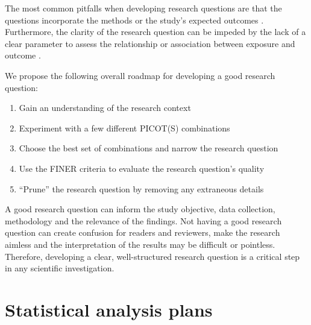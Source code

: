 \documentclass[
]{book}
\providecommand{\tightlist}{%
  \setlength{\itemsep}{0pt}\setlength{\parskip}{0pt}}
\begin{document}
The most common pitfalls when developing research questions are that the questions incorporate the methods or the study's expected outcomes \citep{mayo2013research}. Furthermore, the clarity of the research question can be impeded by the lack of a clear parameter to assess the relationship or association between exposure and outcome \citep{mayo2013research}.

We propose the following overall roadmap for developing a good research question:

\begin{enumerate}
\def\labelenumi{\arabic{enumi}.}
\tightlist
\item
  Gain an understanding of the research context
\item
  Experiment with a few different PICOT(S) combinations
\item
  Choose the best set of combinations and narrow the research question
\item
  Use the FINER criteria to evaluate the research question's quality
\item
  ``Prune'' the research question by removing any extraneous details \citep{vandenbroucke2018ideas}
\end{enumerate}

A good research question can inform the study objective, data collection, methodology and the relevance of the findings. Not having a good research question can create confusion for readers and reviewers, make the research aimless and the interpretation of the results may be difficult or pointless. Therefore, developing a clear, well-structured research question is a critical step in any scientific investigation.

\hypertarget{statistical-analysis-plans}{%
\section{Statistical analysis plans}\label{statistical-analysis-plans}}
\end{document}
